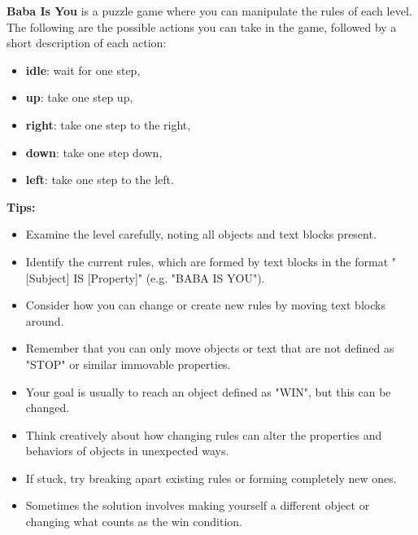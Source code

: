 
\begin{GreenBox}
\textbf{Baba Is You} is a puzzle game where you can manipulate the rules of each level. The following are the possible actions you can take in the game, followed by a short description of each action:

\begin{itemize}
    \item \textbf{idle}: wait for one step,
    \item \textbf{up}: take one step up,
    \item \textbf{right}: take one step to the right,
    \item \textbf{down}: take one step down,
    \item \textbf{left}: take one step to the left.
\end{itemize}

\textbf{Tips:}
\begin{itemize}
    \item Examine the level carefully, noting all objects and text blocks present.
    \item Identify the current rules, which are formed by text blocks in the format "[Subject] IS [Property]" (e.g. "BABA IS YOU").
    \item Consider how you can change or create new rules by moving text blocks around.
    \item Remember that you can only move objects or text that are not defined as "STOP" or similar immovable properties.
    \item Your goal is usually to reach an object defined as "WIN", but this can be changed.
    \item Think creatively about how changing rules can alter the properties and behaviors of objects in unexpected ways.
    \item If stuck, try breaking apart existing rules or forming completely new ones.
    \item Sometimes the solution involves making yourself a different object or changing what counts as the win condition.
\end{itemize}


\end{GreenBox}
